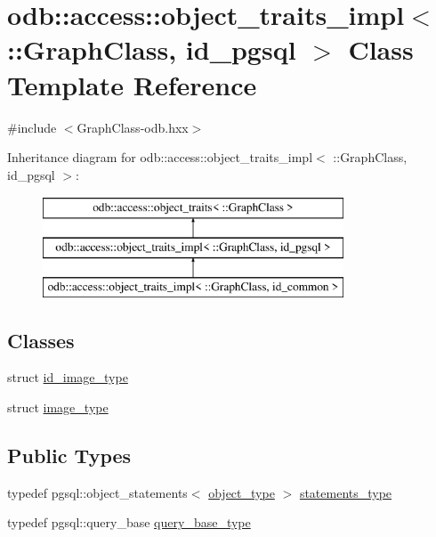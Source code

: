 \hypertarget{classodb_1_1access_1_1object__traits__impl_3_01_1_1_graph_class_00_01id__pgsql_01_4}{}\section{odb\+:\+:access\+:\+:object\+\_\+traits\+\_\+impl$<$ \+:\+:Graph\+Class, id\+\_\+pgsql $>$ Class Template Reference}
\label{classodb_1_1access_1_1object__traits__impl_3_01_1_1_graph_class_00_01id__pgsql_01_4}


{\ttfamily \#include $<$Graph\+Class-\/odb.\+hxx$>$}

Inheritance diagram for odb\+:\+:access\+:\+:object\+\_\+traits\+\_\+impl$<$ \+:\+:Graph\+Class, id\+\_\+pgsql $>$\+:\begin{figure}[H]
\begin{center}
\leavevmode
\includegraphics[height=3.000000cm]{da/d32/classodb_1_1access_1_1object__traits__impl_3_01_1_1_graph_class_00_01id__pgsql_01_4}
\end{center}
\end{figure}
\subsection*{Classes}
\begin{DoxyCompactItemize}
\item 
struct \hyperlink{structodb_1_1access_1_1object__traits__impl_3_01_1_1_graph_class_00_01id__pgsql_01_4_1_1id__image__type}{id\+\_\+image\+\_\+type}
\item 
struct \hyperlink{structodb_1_1access_1_1object__traits__impl_3_01_1_1_graph_class_00_01id__pgsql_01_4_1_1image__type}{image\+\_\+type}
\end{DoxyCompactItemize}
\subsection*{Public Types}
\begin{DoxyCompactItemize}
\item 
typedef pgsql\+::object\+\_\+statements$<$ \hyperlink{classodb_1_1access_1_1object__traits_3_01_1_1_graph_class_01_4_a0808c9b0dc597786e3b5e11fc0f63e43}{object\+\_\+type} $>$ \hyperlink{classodb_1_1access_1_1object__traits__impl_3_01_1_1_graph_class_00_01id__pgsql_01_4_a922126b901bf80b4f4fcae57bed9cb6a}{statements\+\_\+type}
\item 
typedef pgsql\+::query\+\_\+base \hyperlink{classodb_1_1access_1_1object__traits__impl_3_01_1_1_graph_class_00_01id__pgsql_01_4_a0e7e103445edf90aacb32050128dbe2d}{query\+\_\+base\+\_\+type}
\end{DoxyCompactItemize}
